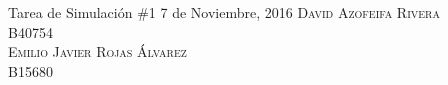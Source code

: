 \documentclass[12pt]{article}
\begin{document}

  \portada
  {Tarea de Simulación \#1}
  {7 de Noviembre, 2016}
  {
    \textsc{\large David Azofeifa Rivera}\\
    \textsc{\large B40754}\\
    [0.25in]
    \textsc{\large Emilio Javier Rojas Álvarez}\\
    \textsc{\large B15680}\\
    [0.5in]
  }

  

  

  
\end{document}
